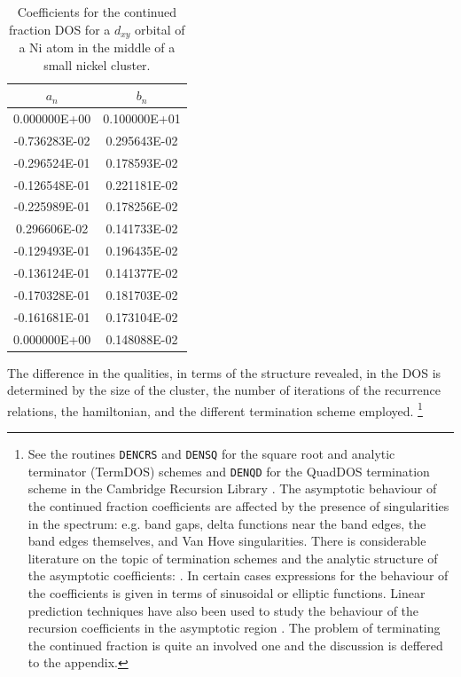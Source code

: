 \begin{table}
\begin{center}
\begin{tabular}{|c|c|}
\hline
$a_{n}$ & $b_{n}$ \\
\hline
 0.000000E+00 & 0.100000E+01\\
-0.736283E-02 & 0.295643E-02\\
-0.296524E-01 & 0.178593E-02\\
-0.126548E-01 & 0.221181E-02\\
-0.225989E-01 & 0.178256E-02\\
 0.296606E-02 & 0.141733E-02\\
-0.129493E-01 & 0.196435E-02\\
-0.136124E-01 & 0.141377E-02\\
-0.170328E-01 & 0.181703E-02\\
-0.161681E-01 & 0.173104E-02\\
 0.000000E+00 & 0.148088E-02\\
\hline
\end{tabular}
\caption{Coefficients for the continued fraction DOS for a $d_{xy}$ orbital of a Ni 
atom in the middle of a small nickel cluster.\label{tab:reccoeffs}}
\end{center}
\end{table}

The difference in the qualities, in terms of the structure revealed, in the DOS 
is determined by the size of the cluster, the number of iterations of the
recurrence relations, the hamiltonian, and the different termination scheme employed. 
\footnote{See the routines \texttt{DENCRS} and \texttt{DENSQ} 
for the square root and analytic terminator (TermDOS) schemes and \texttt{DENQD} 
for the QuadDOS termination scheme in the Cambridge Recursion Library 
\cite{nex84,haydock84,haydock85}.
The asymptotic behaviour of the continued fraction coefficients 
are affected by the presence of singularities
in the spectrum: e.g. band gaps, delta functions near the band edges,
the band edges themselves, and Van Hove singularities.
There is considerable literature on the topic of termination schemes 
and the analytic structure of the asymptotic coefficients:
\cite{hodges77,bylander80,turchi82,haydock84,luchini87,glanville88,
yoshino87,yoshino88,haydock89,haydock10}.
In certain cases expressions for the behaviour of the coefficients
is given in terms of sinusoidal or elliptic functions. Linear prediction techniques
have also been used to study the behaviour of the recursion coefficients in the
asymptotic region \cite{allan84}. The problem of terminating the continued fraction
is quite an involved one and the discussion is deffered to the appendix.}


